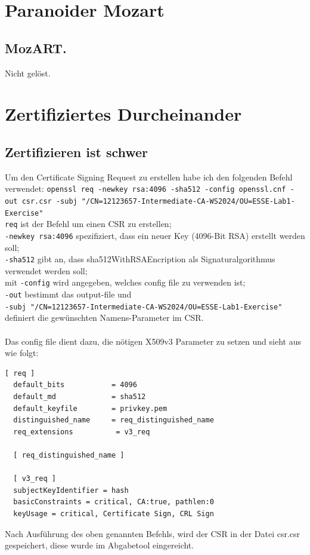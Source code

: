 \documentclass[12pt,a4paper,titlepage,oneside]{scrartcl}
\begin{document}
\section{Paranoider Mozart}

\subsection{MozART.}
Nicht gelöst.


\section{Zertifiziertes Durcheinander}

\subsection{Zertifizieren ist schwer}
Um den Certificate Signing Request zu erstellen habe ich den folgenden Befehl verwendet:
\lstinline{openssl req -newkey rsa:4096 -sha512 -config openssl.cnf -out csr.csr -subj "/CN=12123657-Intermediate-CA-WS2024/OU=ESSE-Lab1-Exercise"} \\
\lstinline{req} ist der Befehl um einen CSR zu erstellen; \\
\lstinline{-newkey rsa:4096} spezifiziert, dass ein neuer Key (4096-Bit RSA) erstellt werden soll; \\
\lstinline{-sha512} gibt an, dass sha512WithRSAEncription als Signaturalgorithmus verwendet werden soll; \\
mit \lstinline{-config} wird angegeben, welches config file zu verwenden ist; \\
\lstinline{-out} bestimmt das output-file und \\
\lstinline{-subj "/CN=12123657-Intermediate-CA-WS2024/OU=ESSE-Lab1-Exercise"} definiert die gewünschten Namens-Parameter im CSR. \\ \\
Das config file dient dazu, die nötigen X509v3 Parameter zu setzen und sieht aus wie folgt:
\begin{lstlisting}[caption=openssl.cnf,label=code:opensslConfig,style=simple]
  [ req ]
  default_bits           = 4096
  default_md             = sha512
  default_keyfile        = privkey.pem
  distinguished_name     = req_distinguished_name
  req_extensions          = v3_req

  [ req_distinguished_name ]

  [ v3_req ]
  subjectKeyIdentifier = hash
  basicConstraints = critical, CA:true, pathlen:0
  keyUsage = critical, Certificate Sign, CRL Sign
\end{lstlisting}
Nach Ausführung des oben genannten Befehls, wird der CSR in der Datei csr.csr gespeichert, diese wurde im Abgabetool eingereicht.
\end{document}
